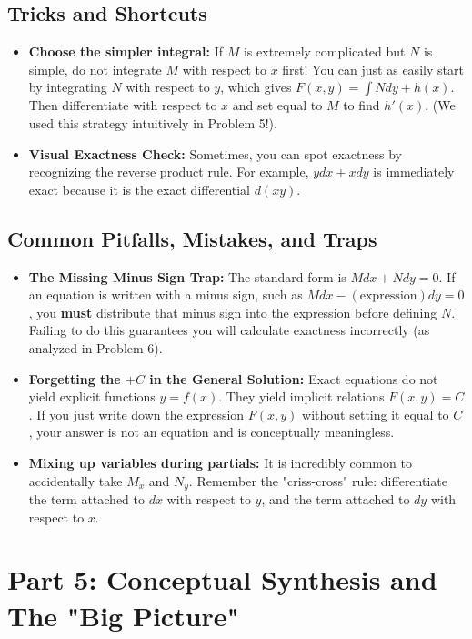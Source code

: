 \documentclass[11pt]{article}
\begin{document}
\subsection{Tricks and Shortcuts}
\begin{itemize}
    \item \textbf{Choose the simpler integral:} If $M$ is extremely complicated but $N$ is simple, do not integrate $M$ with respect to $x$ first! You can just as easily start by integrating $N$ with respect to $y$, which gives $F(x,y) = \int N dy + h(x)$. Then differentiate with respect to $x$ and set equal to $M$ to find $h'(x)$. (We used this strategy intuitively in Problem 5!).
    \item \textbf{Visual Exactness Check:} Sometimes, you can spot exactness by recognizing the reverse product rule. For example, $y dx + x dy$ is immediately exact because it is the exact differential $d(xy)$.
\end{itemize}

\subsection{Common Pitfalls, Mistakes, and Traps}
\begin{itemize}
    \item \textbf{The Missing Minus Sign Trap:} The standard form is $M dx + N dy = 0$. If an equation is written with a minus sign, such as $M dx - (\text{expression}) dy = 0$, you \textbf{must} distribute that minus sign into the expression before defining $N$. Failing to do this guarantees you will calculate exactness incorrectly (as analyzed in Problem 6).
    \item \textbf{Forgetting the $+ C$ in the General Solution:} Exact equations do not yield explicit functions $y = f(x)$. They yield implicit relations $F(x,y) = C$. If you just write down the expression $F(x,y)$ without setting it equal to $C$, your answer is not an equation and is conceptually meaningless.
    \item \textbf{Mixing up variables during partials:} It is incredibly common to accidentally take $M_x$ and $N_y$. Remember the "criss-cross" rule: differentiate the term attached to $dx$ with respect to $y$, and the term attached to $dy$ with respect to $x$.
\end{itemize}

\newpage
\section{Part 5: Conceptual Synthesis and The "Big Picture"}
\end{document}

